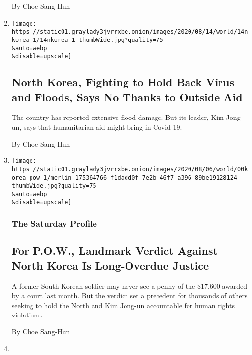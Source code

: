 \begin{enumerate}
  By Choe Sang-Hun
\item
  \href{/2020/08/14/world/asia/north-korea-floods-coronavirus.html}{}

  \texttt{[image: https://static01.graylady3jvrrxbe.onion/images/2020/08/14/world/14nkorea-1/14nkorea-1-thumbWide.jpg?quality=75\\\&auto=webp\\\&disable=upscale]}

  \hypertarget{north-korea-fighting-to-hold-back-virus-and-floods-says-no-thanks-to-outside-aid}{%
  \subsection{North Korea, Fighting to Hold Back Virus and Floods, Says
  No Thanks to Outside
  Aid}\label{north-korea-fighting-to-hold-back-virus-and-floods-says-no-thanks-to-outside-aid}}

  The country has reported extensive flood damage. But its leader, Kim
  Jong-un, says that humanitarian aid might bring in Covid-19.

  By Choe Sang-Hun
\item
  \href{/2020/08/07/world/asia/north-korea-pow-verdict-kim.html}{}

  \texttt{[image: https://static01.graylady3jvrrxbe.onion/images/2020/08/06/world/00korea-pow-1/merlin\_175364766\_f1dadd0f-7e2b-46f7-a396-89be19128124-thumbWide.jpg?quality=75\\\&auto=webp\\\&disable=upscale]}

  \hypertarget{the-saturday-profile}{%
  \subsubsection{The Saturday Profile}\label{the-saturday-profile}}

  \hypertarget{for-pow-landmark-verdict-against-north-korea-is-long-overdue-justice}{%
  \subsection{For P.O.W., Landmark Verdict Against North Korea Is
  Long-Overdue
  Justice}\label{for-pow-landmark-verdict-against-north-korea-is-long-overdue-justice}}

  A former South Korean soldier may never see a penny of the \$17,600
  awarded by a court last month. But the verdict set a precedent for
  thousands of others seeking to hold the North and Kim Jong-un
  accountable for human rights violations.

  By Choe Sang-Hun
\item
  \href{/2020/07/28/world/asia/north-korea-defector-coronavirus.html}{}


\end{enumerate}
